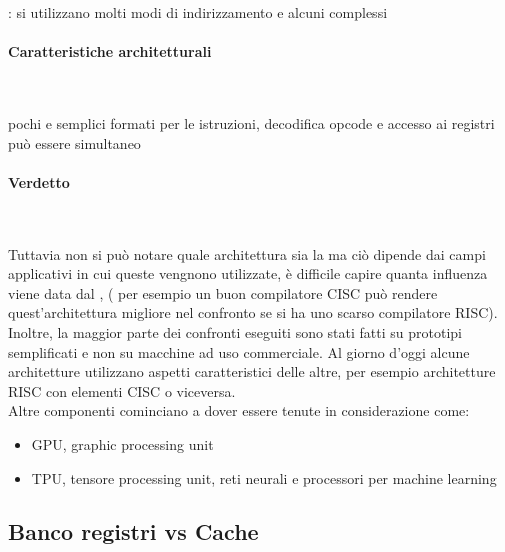 \documentclass[arch.tex]{subfiles}
\begin{document}
: si utilizzano molti modi di indirizzamento e alcuni complessi

\paragraph{Caratteristiche architetturali} \mbox{} \\%
\label{par:caratteristiche_architetturali}

 pochi e semplici formati  per le istruzioni, decodifica opcode e 
accesso ai registri può essere simultaneo

\paragraph{Verdetto} \mbox{} \\%
\label{par:verdetto}

Tuttavia non si può notare quale architettura sia la  ma ciò dipende dai campi
applicativi in cui queste vengnono utilizzate, è difficile capire quanta influenza viene
data dal , ( per esempio un buon compilatore CISC può rendere quest'architettura
migliore nel confronto se si ha uno scarso compilatore RISC). Inoltre, la maggior parte dei 
confronti eseguiti sono stati fatti su prototipi semplificati e non su macchine ad uso 
commerciale. Al giorno d'oggi alcune architetture utilizzano aspetti caratteristici delle
altre, per esempio architetture RISC con elementi CISC o viceversa.\\
Altre componenti cominciano a dover essere tenute in considerazione come:

\begin{itemize}
	\item GPU, graphic processing unit
	\item TPU, tensore processing unit, reti neurali e processori per machine learning
\end{itemize}

\subsection{Banco registri vs Cache}%
\label{sub:banco_registri_vs_cache}
\end{document}
